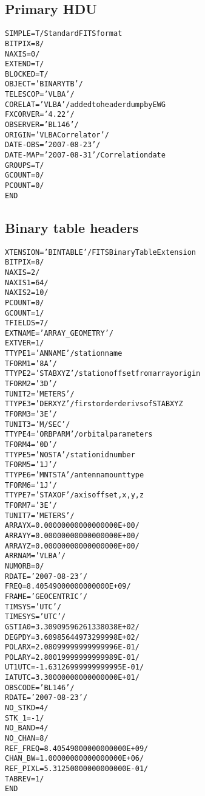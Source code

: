 \documentclass[twoside]{article}
\newcommand{\Ex}[1]{\textcolor{excol}{#1}}
\begin{document}
\subsection{Primary HDU}
\small
\begin{alltt}
SIMPLE  =                    T / Standard FITS format
BITPIX  =                    8 /
NAXIS   =                    0 /
EXTEND  =                    T /
BLOCKED =                    T /
OBJECT  = 'BINARYTB'           /
TELESCOP= 'VLBA    '           /
\Ex{CORELAT = 'VLBA    '           / added to header dump by EWG}
FXCORVER= '4.22    '           /
OBSERVER= 'BL146   '           /
ORIGIN  = 'VLBA Correlator'    /
DATE-OBS= '2007-08-23'         /
DATE-MAP= '2007-08-31'         / Correlation date
GROUPS  =                    T /
GCOUNT  =                    0 /
PCOUNT  =                    0 /
END
\end{alltt}

\subsection{Binary table headers}

\begin{alltt}
XTENSION= 'BINTABLE'           / FITS Binary Table Extension
BITPIX  =                    8 /
NAXIS   =                    2 /
NAXIS1  =                   64 /
NAXIS2  =                   10 /
PCOUNT  =                    0 /
GCOUNT  =                    1 /
TFIELDS =                    7 /
EXTNAME = 'ARRAY_GEOMETRY'     /
EXTVER  =                    1 /
TTYPE1  = 'ANNAME  '           / station name
TFORM1  = '8A      '           /
TTYPE2  = 'STABXYZ '           / station offset from array origin
TFORM2  = '3D      '           /
TUNIT2  = 'METERS  '           /
TTYPE3  = 'DERXYZ  '           / first order derivs of STABXYZ
TFORM3  = '3E      '           /
TUNIT3  = 'M/SEC   '           /
TTYPE4  = 'ORBPARM '           / orbital parameters
TFORM4  = '0D      '           /
TTYPE5  = 'NOSTA   '           / station id number
TFORM5  = '1J      '           /
TTYPE6  = 'MNTSTA  '           / antenna mount type
TFORM6  = '1J      '           /
TTYPE7  = 'STAXOF  '           / axis offset, x, y, z
TFORM7  = '3E      '           /
TUNIT7  = 'METERS  '           /
ARRAYX  =   0.00000000000000000E+00 /
ARRAYY  =   0.00000000000000000E+00 /
ARRAYZ  =   0.00000000000000000E+00 /
ARRNAM  = 'VLBA    '           /
NUMORB  =                    0 /
RDATE   = '2007-08-23'         /
FREQ    =   8.40549000000000000E+09 /
FRAME   = 'GEOCENTRIC'         /
TIMSYS  = 'UTC     '           /
TIMESYS = 'UTC     '           /
GSTIA0  =   3.30909596261338038E+02 /
DEGPDY  =   3.60985644973299998E+02 /
POLARX  =   2.08099999999999996E-01 /
POLARY  =   2.80019999999999989E-01 /
UT1UTC  =  -1.63126999999999995E-01 /
IATUTC  =   3.30000000000000000E+01 /
OBSCODE = 'BL146   '           /
RDATE   = '2007-08-23'         /
NO_STKD =                    4 /
STK_1   =                   -1 /
NO_BAND =                    4 /
NO_CHAN =                    8 /
REF_FREQ=   8.40549000000000000E+09 /
CHAN_BW =   1.00000000000000000E+06 /
REF_PIXL=   5.31250000000000000E-01 /
TABREV  =                    1 /
END
\end{alltt}
\end{document}

